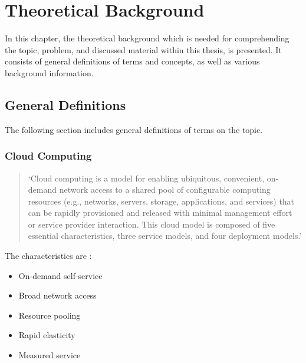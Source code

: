 \chapter{Theoretical Background} 	%
\label{theoretical-background}


In this chapter,
the theoretical background which is needed for comprehending the topic, problem,
and discussed material
within this thesis,
is presented.
It consists of general definitions of terms and concepts,
as well as various background information.


\section{General Definitions}
\label{theoretical-background:general-definitions}

The following section includes general definitions of terms on the topic.

\subsection*{Cloud Computing}

\begin{quotation}
\noindent
\enquote*{Cloud computing is a model for enabling ubiquitous, convenient, on-demand network access to a shared
	pool of configurable computing resources (e.g., networks, servers, storage, applications, and services) that
	can be rapidly provisioned and released with minimal management effort or service provider interaction.
	This cloud model is composed of five essential characteristics, three service models, and four deployment
	models.}
\autocite{cloudComputingNistDefinition2011}
\end{quotation}

The characteristics are
\autocite{cloudComputingNistDefinition2011}:

\begin{itemize}
	\item On-demand self-service
	\item Broad network access
	\item Resource pooling
	\item Rapid elasticity
	\item Measured service
\end{itemize}

